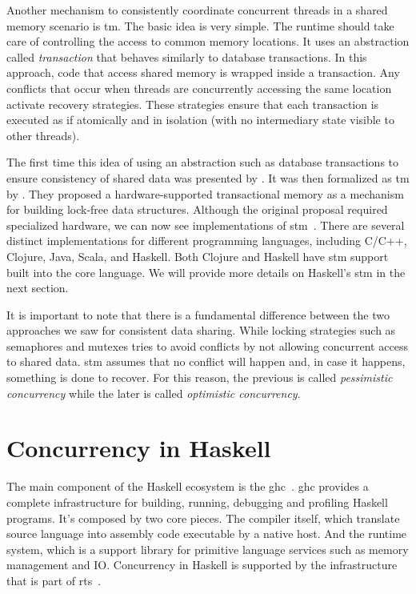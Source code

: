 Another mechanism to consistently coordinate concurrent threads in a shared memory scenario is \ac{tm}. The basic idea is very simple. The runtime should take care of controlling the access to common memory locations. It uses an abstraction called \emph{transaction} that behaves similarly to database transactions. In this approach, code that access shared memory is wrapped inside a transaction. Any conflicts that occur when threads are concurrently accessing the same location activate recovery strategies. These strategies ensure that each transaction is executed as if atomically and in isolation (with no intermediary state visible to other threads).

The first time this idea of using an abstraction such as database transactions to ensure consistency of shared data was presented by \cite{lomet:1977}. It was then formalized as \acl{tm} by \cite{herlihy:1993}. They proposed a hardware-supported transactional memory as a mechanism for building lock-free data structures. Although the original proposal required specialized hardware, we can now see implementations of \ac{stm}~\citep{shavit:1995}. There are several distinct implementations for different programming languages, including C/C++, Clojure, Java, Scala, and Haskell. Both Clojure and Haskell have  \acs{stm} support built into the core language. We will provide more details on Haskell's \acs{stm} in the next section.

It is important to note that there is a fundamental difference between the two approaches we saw for consistent data sharing. While locking strategies such as semaphores and mutexes tries to avoid conflicts by not allowing concurrent access to shared data. \acs{stm} assumes that no conflict will happen and, in case it happens, something is done to recover. For this reason, the previous is called \emph{pessimistic concurrency} while the later is called \emph{optimistic concurrency}.


\section{Concurrency in Haskell}\label{sec:haskell-conc}
The main component of the Haskell ecosystem is the \ac{ghc}~\citep{smpj:1993}. \acs{ghc} provides a complete infrastructure for building, running, debugging and profiling Haskell programs. It's composed by two core pieces. The compiler itself, which translate source language into assembly code executable by a native host. And the runtime system, which is a support library for primitive language services such as memory management and IO. Concurrency in Haskell is supported by the infrastructure that is part of \ac{rts}~\citep{li:2007}.

